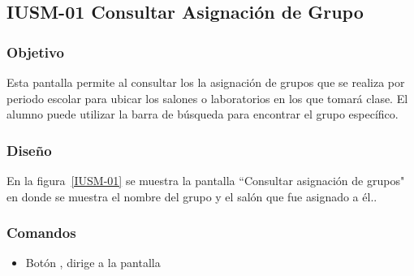 \subsection{IUSM-01 Consultar Asignación de Grupo}

\subsubsection{Objetivo}

	
    Esta pantalla permite al  consultar los la asignación de grupos que se realiza por periodo escolar para ubicar los salones o laboratorios en los que tomará clase. El alumno puede utilizar la barra de búsqueda para encontrar el grupo específico.
\subsubsection{Diseño}


    En la figura~\ref{IUSM-01} se muestra la pantalla ``Consultar asignación de grupos" en donde se muestra el nombre del grupo y el salón que fue asignado a él..
    



\subsubsection{Comandos}
    \begin{itemize}

	\item Botón , dirige a la pantalla 
    \end{itemize}
